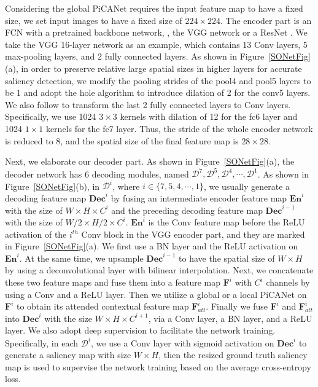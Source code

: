 \documentclass[10pt,twocolumn,letterpaper]{article}
\begin{document}
Considering the global PiCANet requires the input feature map to have a fixed size, we set input images to have a fixed size of $224\times 224$. The encoder part is an FCN with a pretrained backbone network, \eg, the VGG \cite{simonyan2014vgg} network or a ResNet \cite{he2016resnet}. We take the VGG 16-layer network as an example, which contains 13 Conv layers, 5 max-pooling layers, and 2 fully connected layers. As shown in Figure~\ref{SONetFig}(a), in order to preserve relative large spatial sizes in higher layers for accurate saliency detection, we modify the pooling strides of the pool4 and pool5 layers to be 1 and adopt the hole algorithm \cite{chen2016deeplab} to introduce dilation of 2 for the conv5 layers. We also follow \cite{chen2016deeplab} to transform the last 2 fully connected layers to Conv layers. Specifically, we use 1024 $3\times 3$ kernels with dilation of 12 for the fc6 layer and 1024 $1\times 1$ kernels for the fc7 layer. Thus, the stride of the whole encoder network is reduced to 8, and the spatial size of the final feature map is $28\times 28$.

Next, we elaborate our decoder part. As shown in Figure~\ref{SONetFig}(a), the decoder network has 6 decoding modules, named $\mathcal D^7,\mathcal D^5,\mathcal D^4,\cdots,\mathcal D^1$. As shown in Figure~\ref{SONetFig}(b), in $\mathcal D^i$, where $i\in{\{7,5,4,\cdots,1\}}$, we usually generate a decoding feature map $\bm{Dec}^i$ by fusing an intermediate encoder feature map $\bm{En}^i$ with the size of $W\times{H\times C^i}$ and the preceding decoding feature map $\bm{Dec}^{i-1}$ with the size of $W/2\times{H/2\times C^i}$. $\bm{En}^i$ is the Conv feature map before the ReLU activation of the $i^{th}$ Conv block in the VGG encoder part, and they are marked in Figure~\ref{SONetFig}(a). We first use a BN layer and the ReLU activation on $\bm{En}^i$. At the same time, we upsample $\bm{Dec}^{i-1}$ to have the spatial size of $W\times H$ by using a deconvolutional layer with bilinear interpolation. Next, we concatenate these two feature maps and fuse them into a feature map $\bm{F}^i$ with $C^i$ channels by using a Conv and a ReLU layer. Then we utilize a global or a local PiCANet on $\bm{F}^i$ to obtain its attended contextual feature map $\bm{F}_{att}^i$. Finally we fuse $\bm{F}^i$ and $\bm{F}_{att}^i$ into $\bm{Dec}^i$ with the size $W\times{H\times C^{i+1}}$, via a Conv layer, a BN layer, and a ReLU layer. We also adopt deep supervision to facilitate the network training. Specifically, in each $\mathcal D^i$, we use a Conv layer with sigmoid activation on $\bm{Dec}^i$ to generate a saliency map with size $W\times H$, then the resized ground truth saliency map is used to supervise the network training based on the average cross-entropy loss.
\end{document}
